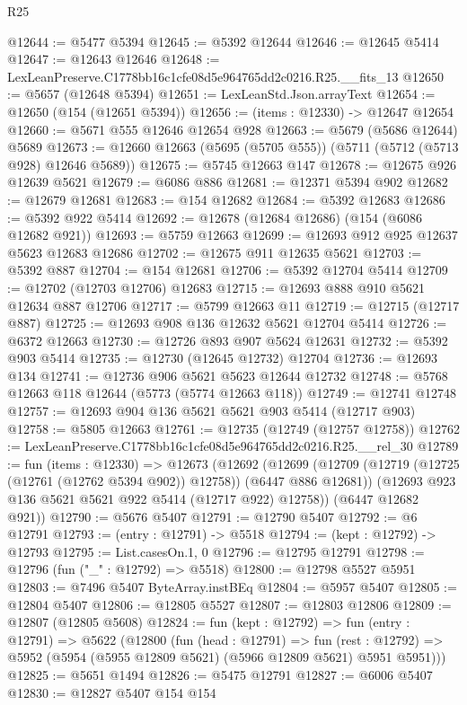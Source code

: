 \begin{lexlean}{R25}
\begin{coremodule}
@12644 := @5477 @5394
@12645 := @5392 @12644
@12646 := @12645 @5414
@12647 := @12643 @12646
@12648 := LexLeanPreserve.C1778bb16c1cfe08d5e964765dd2c0216.R25.__fits_13
@12650 := @5657 (@12648 @5394)
@12651 := LexLeanStd.Json.arrayText
@12654 := @12650 (@154 (@12651 @5394))
@12656 := (items : @12330) -> @12647 @12654
@12660 := @5671 @555 @12646 @12654 @928
@12663 := @5679 (@5686 @12644) @5689
@12673 := @12660 @12663 (@5695 (@5705 @555)) (@5711 (@5712 (@5713 @928) @12646 @5689))
@12675 := @5745 @12663 @147
@12678 := @12675 @926 @12639 @5621
@12679 := @6086 @886
@12681 := @12371 @5394 @902
@12682 := @12679 @12681
@12683 := @154 @12682
@12684 := @5392 @12683
@12686 := @5392 @922 @5414
@12692 := @12678 (@12684 @12686) (@154 (@6086 @12682 @921))
@12693 := @5759 @12663
@12699 := @12693 @912 @925 @12637 @5623 @12683 @12686
@12702 := @12675 @911 @12635 @5621
@12703 := @5392 @887
@12704 := @154 @12681
@12706 := @5392 @12704 @5414
@12709 := @12702 (@12703 @12706) @12683
@12715 := @12693 @888 @910 @5621 @12634 @887 @12706
@12717 := @5799 @12663 @11
@12719 := @12715 (@12717 @887)
@12725 := @12693 @908 @136 @12632 @5621 @12704 @5414
@12726 := @6372 @12663
@12730 := @12726 @893 @907 @5624 @12631
@12732 := @5392 @903 @5414
@12735 := @12730 (@12645 @12732) @12704
@12736 := @12693 @134
@12741 := @12736 @906 @5621 @5623 @12644 @12732
@12748 := @5768 @12663 @118 @12644 (@5773 (@5774 @12663 @118))
@12749 := @12741 @12748
@12757 := @12693 @904 @136 @5621 @5621 @903 @5414 (@12717 @903)
@12758 := @5805 @12663
@12761 := @12735 (@12749 (@12757 @12758))
@12762 := LexLeanPreserve.C1778bb16c1cfe08d5e964765dd2c0216.R25.__rel_30
@12789 := fun (items : @12330) =>
  @12673
    (@12692
      (@12699
        (@12709 (@12719 (@12725 (@12761 (@12762 @5394 @902)) @12758)) (@6447 @886 @12681))
        (@12693 @923 @136 @5621 @5621 @922 @5414 (@12717 @922) @12758))
      (@6447 @12682 @921))
@12790 := @5676 @5407
@12791 := @12790 @5407
@12792 := @6 @12791
@12793 := (entry : @12791) -> @5518
@12794 := (kept : @12792) -> @12793
@12795 := List.casesOn.{1, 0}
@12796 := @12795 @12791
@12798 := @12796 (fun ("_" : @12792) => @5518)
@12800 := @12798 @5527 @5951
@12803 := @7496 @5407 ByteArray.instBEq
@12804 := @5957 @5407
@12805 := @12804 @5407
@12806 := @12805 @5527
@12807 := @12803 @12806
@12809 := @12807 (@12805 @5608)
@12824 := fun (kept : @12792) =>
  fun (entry : @12791) =>
  @5622
    (@12800
      (fun (head : @12791) =>
      fun (rest : @12792) => @5952 (@5954 (@5955 @12809 @5621) (@5966 @12809 @5621) @5951 @5951)))
@12825 := @5651 @1494
@12826 := @5475 @12791
@12827 := @6006 @5407
@12830 := @12827 @5407 @154 @154

\end{coremodule}
\end{lexlean}

